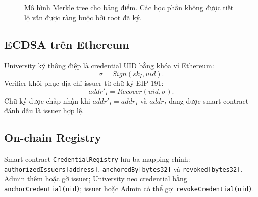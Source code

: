 \begin{figure}[t]
  \centering
  
  \caption{Mô hình Merkle tree cho bảng điểm. Các học phần không được tiết lộ vẫn được ràng buộc bởi root đã ký.}
  \label{fig:merkle}
\end{figure}

\subsection{ECDSA trên Ethereum}

University ký thông điệp là credential UID bằng khóa ví Ethereum:
\begin{equation}
  \sigma = Sign(sk_I, uid).
\end{equation}
Verifier khôi phục địa chỉ issuer từ chữ ký EIP-191:
\begin{equation}
  addr'_I = Recover(uid, \sigma).
\end{equation}
Chữ ký được chấp nhận khi $addr'_I = addr_I$ và $addr_I$ đang được smart contract đánh dấu là issuer hợp lệ.

\subsection{On-chain Registry}

Smart contract \texttt{CredentialRegistry} lưu ba mapping chính: \texttt{authorizedIssuers[address]}, \texttt{anchoredBy[bytes32]} và \texttt{revoked[bytes32]}. Admin thêm hoặc gỡ issuer; University neo credential bằng \texttt{anchorCredential(uid)}; issuer hoặc Admin có thể gọi \texttt{revokeCredential(uid)}.
